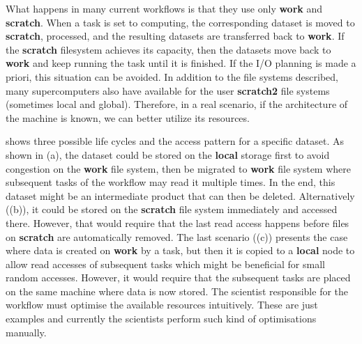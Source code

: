 \documentclass[a4paper]{article}
\begin{document}
What happens in many current workflows is that they use only \textbf{work} and \textbf{scratch}.
When a task is set to computing, the corresponding dataset is moved to \textbf{scratch}, processed, and the resulting datasets are transferred back to \textbf{work}.
If the \textbf{scratch} filesystem achieves its capacity, then the datasets move back to \textbf{work} and keep running the task until it is finished.
If the I/O planning is made a priori, this situation can be avoided.
In addition to the file systems described, many supercomputers also have available for the user \textbf{scratch2} file systems (sometimes local and global).
Therefore, in a real scenario, if the architecture of the machine is known, we can better utilize its resources.

 shows three possible life cycles and the access pattern for a specific dataset.
As shown in (a), the dataset could be stored on the \textbf{local} storage first to avoid congestion on the \textbf{work} file system, then be migrated to \textbf{work} file system where subsequent tasks of the workflow may read it multiple times.
In the end, this dataset might be an intermediate product that can then be deleted.
Alternatively ((b)), it could be stored on the \textbf{scratch} file system immediately and accessed there.
However, that would require that the last read access happens before files on \textbf{scratch} are automatically removed.
The last scenario ((c)) presents the case where data is created on \textbf{work} by a task, but then it is copied to a \textbf{local} node to allow read accesses of subsequent tasks which might be beneficial for small random accesses.
However, it would require that the subsequent tasks are placed on the same machine where data is now stored.
The scientist responsible for the workflow must optimise the available resources intuitively.
These are just examples and currently the scientists perform such kind of optimisations manually.
\end{document}
